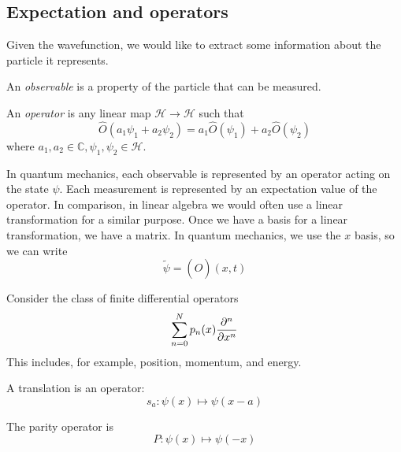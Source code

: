 \subsection{Expectation and operators}
Given the wavefunction, we would like to extract some information about the particle it represents.
\begin{definition}
	An \textit{observable} is a property of the particle that can be measured.
\end{definition}
\begin{definition}
	An \textit{operator} is any linear map \( \mathcal H \to \mathcal H \) such that
	\[
		\hat O(a_1 \psi_1 + a_2 \psi_2) = a_1 \hat O(\psi_1) + a_2 \hat O(\psi_2)
	\]
	where \( a_1, a_2 \in \mathbb C, \psi_1, \psi_2 \in \mathcal H \).
\end{definition}
In quantum mechanics, each observable is represented by an operator acting on the state \( \psi \).
Each measurement is represented by an expectation value of the operator.
In comparison, in linear algebra we would often use a linear transformation for a similar purpose.
Once we have a basis for a linear transformation, we have a matrix.
In quantum mechanics, we use the \( x \) basis, so we can write
\[
	\widetilde \psi = (\hat O)(x, t)
\]
\begin{example}
	Consider the class of finite differential operators
	\[
		\sum_{n=0}^N p_n(x) \pdv[n]{x}
	\]
	This includes, for example, position, momentum, and energy.
\end{example}
\begin{example}
	A translation is an operator:
	\[
		s_a \colon \psi(x) \mapsto \psi(x-a)
	\]
\end{example}
\begin{example}
	The parity operator is
	\[
		P \colon \psi(x) \mapsto \psi(-x)
	\]
\end{example}


